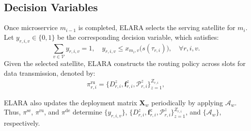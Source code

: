 \documentclass[10pt, conference, letterpaper]{IEEEtran}
\begin{document}
\subsection{Decision Variables}
Once microservice $m_{i-1}$ is completed, ELARA selects the serving satellite for $m_i$. Let $y_{r,i,v} \in \{0,1\}$ be the corresponding decision variable, which satisfies:
\begin{equation}
{\sum}_{v\in\mathcal{V}} y_{r,i,v}=1,\quad  y_{r,i,v}\leq x_{m_i,v}\big(s(\tau_{r,i})\big),\quad \forall r,i,v.
\label{eq:serving_unique_elara}
\end{equation}
Given the selected satellite, ELARA constructs the routing policy across slots for data transmission, denoted by:
\begin{align}
\pi^{\text{ru}}_{r,i} = \{D^z_{r,i}, \mathbf{f}^z_{r,i}, \mathcal{P}^z_{r,i}\}_{z=1}^{Z_{r,i}},
\label{eq:service_routing_policy}
\end{align}

ELARA also updates the deployment matrix $\mathbf{X}_{w}$ periodically by applying $\mathcal{A}_{w}$.
Thus, $\pi^{\text{se}}$, $\pi^{\text{ru}}$, and $\pi^{\text{de}}$ determine $\{y_{r,i,v}\}$, $\{D^z_{r,i}, \mathbf{f}^z_{r,i}, \mathcal{P}^z_{r,i}\}_{z=1}^{Z_{r,i}}$, and $\{\mathcal A_w\}$, respectively.
\end{document}
